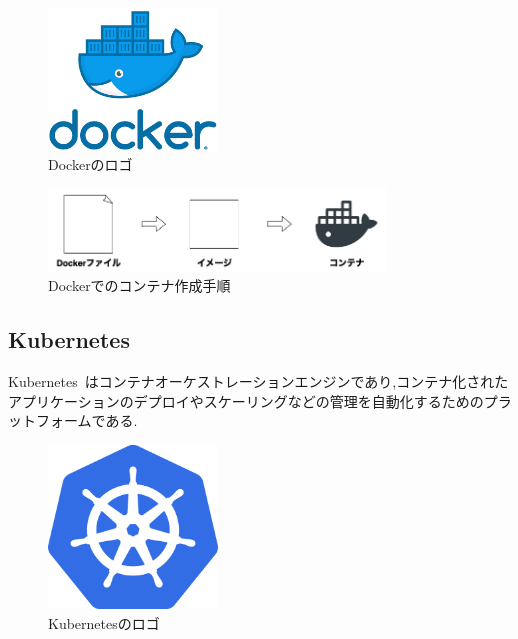 \begin{figure}[htbp]
\begin{center}
    \includegraphics[width=0.4\textwidth]{./figures/docker-logo.png}
    \caption{Dockerのロゴ}
\end{center}
\end{figure}

\begin{figure}[htbp]
\begin{center}
    \includegraphics[width=0.8\textwidth]{./figures/docker-process.jpg}
    \caption{Dockerでのコンテナ作成手順}
\end{center}
\end{figure}

\subsection{Kubernetes}
\label{background:container-orchestration-system:kubernetes}

Kubernetes~\cite{Kubernetes}はコンテナオーケストレーションエンジンであり,コンテナ化されたアプリケーションのデプロイやスケーリングなどの管理を自動化するためのプラットフォームである.

\begin{figure}[htbp]
\begin{center}
    \includegraphics[width=0.4\textwidth]{./figures/kubernetes_logo.png}
    \caption{Kubernetesのロゴ}
\end{center}
\end{figure}

